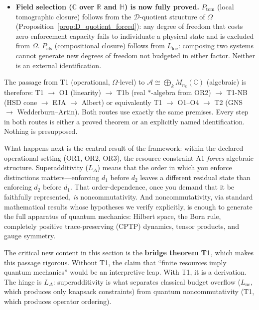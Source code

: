 \documentclass[11pt]{article}
\theoremstyle{remark}
\begin{document}
\begin{itemize}[nosep,leftmargin=2em,itemsep=3pt]
\item \textbf{Field selection ($\mathbb{C}$ over $\mathbb{R}$ and $\mathbb{H}$) is now fully proved.}  $P_{\mathrm{tom}}$ (local tomographic closure) follows from the $\mathcal{D}$-quotient structure of $\Omega$ (Proposition~\ref{prop:D_quotient_forced}): any degree of freedom that costs zero enforcement capacity fails to individuate a physical state and is excluded from $\Omega$.  $P_{\mathrm{cls}}$ (compositional closure) follows from $L_{\mathrm{loc}}$: composing two systems cannot generate new degrees of freedom not budgeted in either factor.  Neither is an external identification.
\end{itemize}

The passage from T1 (operational, $\Omega$-level) to $\mathcal{A} \cong \bigoplus_k M_{n_k}(\mathbb{C})$ (algebraic) is therefore: T1 $\to$ O1 (linearity) $\to$ T1b (real $*$-algebra from OR2) $\to$ T1-NB (HSD cone $\to$ EJA $\to$ Albert) or equivalently T1 $\to$ O1--O4 $\to$ T2 (GNS $\to$ Wedderburn--Artin).  Both routes use exactly the same premises.  Every step in both routes is either a proved theorem or an explicitly named identification.  Nothing is presupposed.

What happens next is the central result of the framework: within the declared operational setting (OR1, OR2, OR3), the resource constraint A1 \emph{forces} algebraic structure.  Superadditivity ($L_\Delta$) means that the order in which you enforce distinctions matters---enforcing $d_1$ before $d_2$ leaves a different residual state than enforcing $d_2$ before $d_1$.  That order-dependence, once you demand that it be faithfully represented, \emph{is} noncommutativity.  And noncommutativity, via standard mathematical results whose hypotheses we verify explicitly, is enough to generate the full apparatus of quantum mechanics: Hilbert space, the Born rule, completely positive trace-preserving (CPTP) dynamics, tensor products, and gauge symmetry.

The critical new content in this section is the \textbf{bridge theorem T1}, which makes this passage rigorous.  Without T1, the claim that ``finite resources imply quantum mechanics'' would be an interpretive leap.  With T1, it is a derivation.  The hinge is $L_\Delta$: superadditivity is what separates classical budget overflow ($L_{\mathrm{nc}}$, which produces only knapsack constraints) from quantum noncommutativity (T1, which produces operator ordering).
\end{document}
